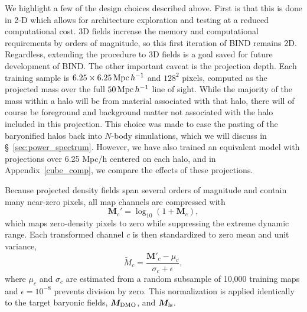 \documentclass[linenumbers,trackchanges, twocolumn]{aastex701}
\begin{document}
We highlight a few of the design choices described above. First is that this is done in 2-D which allows for architecture exploration and testing at a reduced computational cost. 3D fields increase the memory and computational requirements by orders of magnitude, so this first iteration of BIND remains 2D. %
Regardless, extending the procedure to 3D fields is a goal saved for future development of BIND. The other important caveat is the projection depth. Each training sample is $6.25\times6.25\,{\rm Mpc}\,h^{-1}$ and $128^2$ pixels, computed as the projected mass over the full $50\,{\rm Mpc}\,h^{-1}$ line of sight. While the majority of the mass within a halo will be from material associated with that halo, there will of course be foreground and background matter not associated with the halo included in this projection. This choice was made to ease the pasting of the baryonified halos back into $N$-body simulations, which we will discuss in \S~\ref{sec:power_spectrum}. However, we have also trained an equivalent model with projections over 6.25 Mpc/h centered on each halo, and in Appendix~\ref{cube_comp}, we compare the effects of these projections. 

Because projected density fields span several orders of magnitude and contain many near-zero pixels, all map channels are compressed with
\begin{equation}
    \bm{M}_c' = \log_{10}(1 + \bm{M}_c),
    \label{eq:logtransform}
\end{equation}
which maps zero-density pixels to zero while suppressing the extreme dynamic range. Each transformed channel $c$ is then standardized to zero mean and unit variance,
\begin{equation}
    \tilde{M}_c
    = \frac{\bm{M}'_c - \mu_c}{\sigma_c + \epsilon},
    \label{eq:zscore}
\end{equation}
where $\mu_c$ and $\sigma_c$ are estimated from a random subsample of 10{,}000 training maps and $\epsilon = 10^{-8}$ prevents division by zero. This normalization is applied identically to the target baryonic fields, $\bm{M}_{\rm DMO}$, and $\bm{M}_{\rm ls}$.
\end{document}
